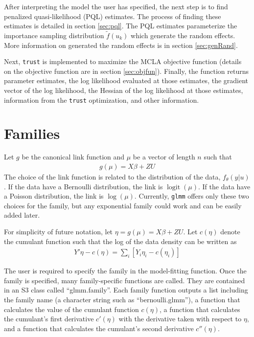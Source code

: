 \documentclass{article}
\DeclareMathOperator{\logit}{logit}
\begin{document}
  After interpreting the model the user has specified, the next step is to find penalized quasi-likelihood (PQL) estimates.  The process of finding these estimates is detailed in section \ref{sec:pql}. The PQL estimates parameterize the importance sampling distribution $\tilde{f}(u_k)$ which generate the random effects.  More information on generated the random effects is in section \ref{sec:genRand}. 

Next, \texttt{trust} is implemented to maximize  the MCLA objective function (details on the objective function are in section \ref{sec:objfun}). Finally, the function  returns parameter estimates, the log likelihood evaluated at those estimates, the gradient vector of the log likelihood,  the Hessian of the log likelihood at those estimates, information from the \texttt{trust} optimization, and other information.


\section{Families} \label{sec:fam}


Let $g$ be the canonical link function and $\mu$ be a vector of length $n$ such that
\begin{align}
g(\mu) = X \beta + Z U
\end{align}
The choice of the link function is related to the distribution of the data, $ f_\theta(y|u)$. If the data have a  Bernoulli distribution, the link is $\logit(\mu)$. If the data have a Poisson distribution, the link is $\log (\mu)$. Currently, \texttt{glmm} offers only these two choices for the family, but any exponential family could work and can be easily added later.

 For simplicity of future notation, let $\eta=g(\mu)=X \beta + Z U$. Let $c(\eta)$ denote the cumulant function such that the log of the data density can be written as
\begin{align}
Y' \eta - c(\eta) = \sum_i \left[ Y_i \eta_i - c(\eta_i)  \right]
\end{align}

The user is required to specify the family in the model-fitting function. Once the family is specified, many family-specific functions are called. They are contained in an S3 class called ``glmm.family''. Each family function outputs a list including the family name (a character string such as ``bernoulli.glmm''), a function that calculates the value of the cumulant function $c(\eta)$,  a function that calculates the cumulant's first derivative $c'(\eta)$ with the derivative taken with respect to $\eta$, and  a function that calculates the cumulant's second derivative $c''(\eta)$. 
\end{document}
